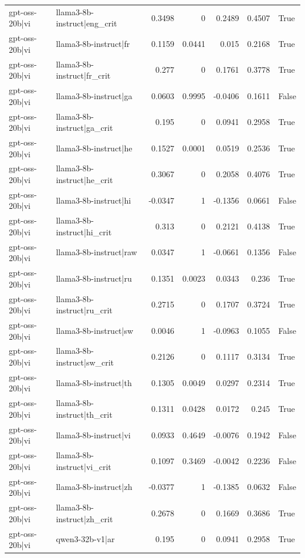 \begin{table}
\begin{tabular}{l l r r r r l}
gpt-oss-20b|vi & llama3-8b-instruct|eng_crit & 0.3498 & 0 & 0.2489 & 0.4507 & True \\
gpt-oss-20b|vi & llama3-8b-instruct|fr & 0.1159 & 0.0441 & 0.015 & 0.2168 & True \\
gpt-oss-20b|vi & llama3-8b-instruct|fr_crit & 0.277 & 0 & 0.1761 & 0.3778 & True \\
gpt-oss-20b|vi & llama3-8b-instruct|ga & 0.0603 & 0.9995 & -0.0406 & 0.1611 & False \\
gpt-oss-20b|vi & llama3-8b-instruct|ga_crit & 0.195 & 0 & 0.0941 & 0.2958 & True \\
gpt-oss-20b|vi & llama3-8b-instruct|he & 0.1527 & 0.0001 & 0.0519 & 0.2536 & True \\
gpt-oss-20b|vi & llama3-8b-instruct|he_crit & 0.3067 & 0 & 0.2058 & 0.4076 & True \\
gpt-oss-20b|vi & llama3-8b-instruct|hi & -0.0347 & 1 & -0.1356 & 0.0661 & False \\
gpt-oss-20b|vi & llama3-8b-instruct|hi_crit & 0.313 & 0 & 0.2121 & 0.4138 & True \\
gpt-oss-20b|vi & llama3-8b-instruct|raw & 0.0347 & 1 & -0.0661 & 0.1356 & False \\
gpt-oss-20b|vi & llama3-8b-instruct|ru & 0.1351 & 0.0023 & 0.0343 & 0.236 & True \\
gpt-oss-20b|vi & llama3-8b-instruct|ru_crit & 0.2715 & 0 & 0.1707 & 0.3724 & True \\
gpt-oss-20b|vi & llama3-8b-instruct|sw & 0.0046 & 1 & -0.0963 & 0.1055 & False \\
gpt-oss-20b|vi & llama3-8b-instruct|sw_crit & 0.2126 & 0 & 0.1117 & 0.3134 & True \\
gpt-oss-20b|vi & llama3-8b-instruct|th & 0.1305 & 0.0049 & 0.0297 & 0.2314 & True \\
gpt-oss-20b|vi & llama3-8b-instruct|th_crit & 0.1311 & 0.0428 & 0.0172 & 0.245 & True \\
gpt-oss-20b|vi & llama3-8b-instruct|vi & 0.0933 & 0.4649 & -0.0076 & 0.1942 & False \\
gpt-oss-20b|vi & llama3-8b-instruct|vi_crit & 0.1097 & 0.3469 & -0.0042 & 0.2236 & False \\
gpt-oss-20b|vi & llama3-8b-instruct|zh & -0.0377 & 1 & -0.1385 & 0.0632 & False \\
gpt-oss-20b|vi & llama3-8b-instruct|zh_crit & 0.2678 & 0 & 0.1669 & 0.3686 & True \\
gpt-oss-20b|vi & qwen3-32b-v1|ar & 0.195 & 0 & 0.0941 & 0.2958 & True \\

\end{tabular}
\end{table}
